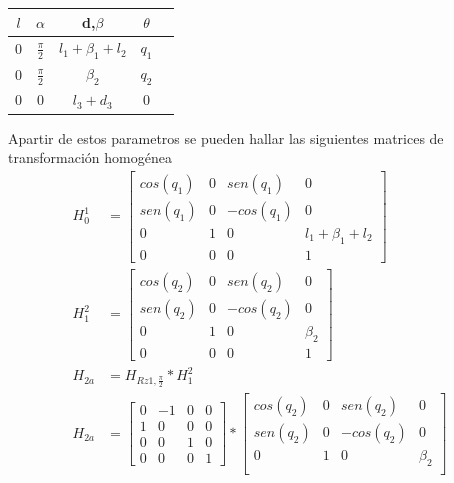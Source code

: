 \documentclass[12pt]{article}
\begin{document}
\begin{enumerate}
    \begin{center}
        \begin{tabular}{ |c|c|c|c|c| } 
            \hline
            $l$ & $\alpha$ & d,$\beta$ & $\theta$\\
            \hline
            $0$ & $\frac{\pi}{2}$ & $l_1+\beta_1+l_2$ & $q_1$\\ 
            $0$ & $\frac{\pi}{2}$ & $\beta_2$ & $q_2$ \\ 
            $0$ & $0$ & $l_3+d_3$ &$0$ \\ 
            \hline
        \end{tabular}
    \end{center}
    Apartir de estos parametros se pueden hallar las siguientes matrices de transformación homogénea
    \begin{equation}
        \begin{split}
            H_0^1&=
            \begin{bmatrix}
                cos(q_1)&0 & sen(q_1)& 0\\
                sen(q_1)&0&-cos(q_1)&0\\
                0&1&0&l_1+\beta_1+l_2\\
                0&0&0&1
            \end{bmatrix}\\
            H_1^2&=
            \begin{bmatrix}
                cos(q_2)&0 & sen(q_2)& 0\\
                sen(q_2)&0&-cos(q_2)&0\\
                0&1&0&\beta_2\\
                0&0&0&1
            \end{bmatrix}\\
            H_{2a}&=H_{Rz1,\frac{\pi}{2}}*H_1^2\\
            H_{2a}&=
            \begin{bmatrix}
                0&-1&0&0\\
                1&0&0&0\\
                0&0&1&0\\
                0&0&0&1
            \end{bmatrix}*
            \begin{bmatrix}
                cos(q_2)&0 & sen(q_2)& 0\\
                sen(q_2)&0&-cos(q_2)&0\\
                0&1&0&\beta_2\\

\end{bmatrix}
\end{split}
\end{equation}
\end{enumerate}
\end{document}
